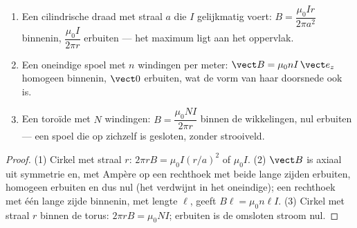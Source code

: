 \begin{proposition}\label{prop:b1:magnetostatics:ampereapps}
\begin{enumerate}
  \item Een cilindrische draad met straal $a$ die $I$ gelijkmatig voert:
        $B = \dfrac{\mu_0Ir}{2\pi a^2}$ binnenin, $\dfrac{\mu_0I}{2\pi r}$ erbuiten
        --- het maximum ligt aan het oppervlak.
  \item Een oneindige spoel met $n$ windingen per meter: $\vect B = \mu_0nI\,
        \vect e_z$ homogeen binnenin, $\vect 0$ erbuiten, wat de vorm van
        haar doorsnede ook is.
  \item Een toroïde met $N$ windingen: $B = \dfrac{\mu_0NI}{2\pi r}$ binnen de
        wikkelingen, nul erbuiten --- een spoel die op zichzelf is gesloten, zonder
        strooiveld.
\end{enumerate}
\end{proposition}

\begin{proof}
(1) Cirkel met straal $r$: $2\pi rB = \mu_0I(r/a)^2$ of $\mu_0I$. (2) $\vect B$
is axiaal uit symmetrie en, met Ampère op een rechthoek met beide lange zijden
erbuiten, homogeen erbuiten en dus nul (het verdwijnt in het oneindige); een
rechthoek met één lange zijde binnenin, met lengte $\ell$, geeft $B\ell =
\mu_0n\ell I$. (3) Cirkel met straal $r$ binnen de torus: $2\pi rB =
\mu_0NI$; erbuiten is de omsloten stroom nul.
\end{proof}

